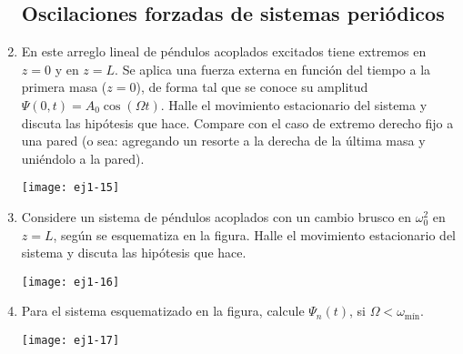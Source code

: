 \documentclass[11pt,spanish,a4paper]{article}
\begin{document}
\begin{enumerate}
\subsection*{Oscilaciones forzadas de sistemas periódicos}


\item
\begin{minipage}[t][3.5cm]{0.6\textwidth}
En este arreglo lineal de péndulos acoplados excitados tiene extremos en $z= 0$ y en $z= L$.
Se aplica una fuerza externa en función del tiempo a la primera masa ($z=0$), de forma tal que se conoce su amplitud $\Psi(0,t)= A_0 \cos(\Omega t)$.
Halle el movimiento estacionario del sistema y discuta las hipótesis que hace.
Compare con el caso de extremo derecho fijo a una pared (o sea: agregando un resorte a la derecha de la última masa y uniéndolo a la pared). 
\end{minipage}
\begin{minipage}[c][0cm][t]{0.35\textwidth}
  \texttt{[image: ej1-15]}
\end{minipage}



\item
\begin{minipage}[t][4cm]{0.35\textwidth}
Considere un sistema de péndulos acoplados con un cambio brusco en $\omega_{0}^{2}$ en $z=L$, según se esquematiza en la figura.
Halle el movimiento estacionario del sistema y discuta las hipótesis que hace.
\end{minipage}
\begin{minipage}[c][1cm][t]{0.6\textwidth}
  \texttt{[image: ej1-16]}
\end{minipage}



\item
\begin{minipage}[t][3.5cm]{0.45\textwidth}
Para el sistema esquematizado en la figura, calcule $\Psi_{n}(t)$, si $\Omega<\omega_\textrm{mín}$.
\end{minipage}
\begin{minipage}[c][2cm][t]{0.5\textwidth}
  \texttt{[image: ej1-17]}
\end{minipage}




\end{enumerate}
\end{document}
